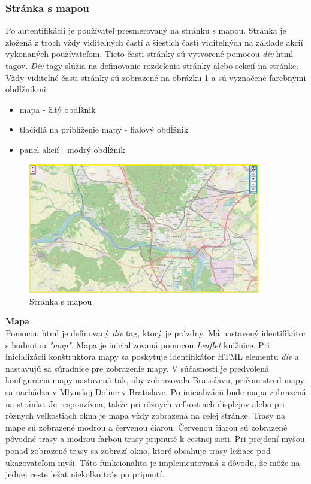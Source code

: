 \subsubsection{Stránka s mapou}
Po autentifikácií je používateľ presmerovaný na stránku s mapou. Stránka je zložená z troch vždy viditeľných častí a šiestich častí viditeľných na základe akcií vykonaných používateľom. Tieto časti stránky sú vytvorené pomocou \textit{div} \acrshort{html} tagov. \textit{Div} tagy slúžia na definovanie rozdelenia stránky alebo sekcií na stránke. Vždy viditeľné časti stránky sú zobrazené na obrázku \ref{fig:map} a sú vyznačené farebnými obdĺžnikmi:
\begin{itemize}
  \item mapa - žltý obdĺžnik
  \item tlačidlá na priblíženie mapy - fialový obdĺžnik
  \item panel akcií - modrý obdĺžnik
\end{itemize}
\begin{figure}[H]
  \centering
  \includegraphics[width=0.9\textwidth]{img/map.png}
  \caption{Stránka s mapou}
  \label{fig:map}
\end{figure}

\noindent\textbf{Mapa}\\
\indent Pomocou \acrshort{html} je definovaný \textit{div} tag, ktorý je prázdny. Má nastavený identifikátor s hodnotou \textit{"map"}. Mapa je inicializovaná pomocou \textit{Leaflet} knižnice\cite{leaflet}. Pri inicializácii konštruktora mapy sa poskytuje identifikátor HTML elementu \textit{div} a nastavujú sa súradnice pre zobrazenie mapy. V súčasnosti je predvolená konfigurácia mapy nastavená tak, aby zobrazovala Bratislavu, pričom stred mapy sa nachádza v Mlynskej Doline v Bratislave. Po inicializácii bude mapa zobrazená na stránke. Je responzívna, takže pri rôznych veľkostiach displejov alebo pri rôznych veľkostiach okna je mapa vždy zobrazená na celej stránke.  Trasy na mape sú zobrazené modrou a červenou čiarou. Červenou čiarou sú zobrazené pôvodné trasy a modrou farbou trasy pripnuté k cestnej sieti. Pri prejdení myšou ponad zobrazené trasy sa zobrazí okno, ktoré obsahuje trasy ležiace pod ukazovateľom myši. Táto funkcionalita je implementovaná z dôvodu, že môže na jednej ceste ležať niekoľko trás po pripnutí.  \\

